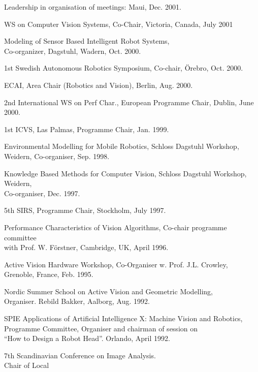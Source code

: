 \documentclass{article}
\begin{document}
\begin{cv}
\begin{cvlist}{Leadership in organisation of meetings:}
  Maui, \cftdotfill{\cftdotsep} Dec. 2001.
\item WS on Computer Vision Systems, Co-Chair, Victoria,
  Canada,\cftdotfill{\cftdotsep} July 2001
\item Modeling of Sensor Based Intelligent Robot Systems,\\
  Co-organizer, Dagstuhl, Wadern, \cftdotfill{\cftdotsep} Oct. 2000.
\item 1st Swedish Autonomous Robotics Symposium, Co-chair, \"Orebro,
  \cftdotfill{\cftdotsep}Oct. 2000.
\item ECAI, Area Chair (Robotics and Vision), Berlin,
  \cftdotfill{\cftdotsep} Aug. 2000.
\item 2nd International WS on Perf Char., European Programme Chair,
  Dublin,\cftdotfill{\cftdotsep} June 2000.
\item 1st ICVS, Las Palmas, Programme Chair, \cftdotfill{\cftdotsep}
  Jan. 1999.
\item Environmental Modelling for Mobile Robotics, Schloss Dagstuhl
  Workshop,\\ Weidern, Co-organiser, \cftdotfill{\cftdotsep}
  Sep. 1998.
\item Knowledge Based Methods for Computer Vision, Schloss Dagstuhl
  Workshop, Weidern,\\ Co-organiser, \cftdotfill{\cftdotsep}
  Dec. 1997.
\item 5th SIRS, Programme Chair, Stockholm, \cftdotfill{\cftdotsep}
  July 1997.
\item Performance Characteristics of Vision Algorithms, Co-chair
  programme committee\\ with Prof. W. F\"orstner, Cambridge, UK,
  \cftdotfill{\cftdotsep} April 1996.
\item Active Vision Hardware Workshop, Co-Organiser w. Prof. J.L.
  Crowley, \\Grenoble, France,\cftdotfill{\cftdotsep} Feb. 1995.
\item Nordic Summer School on Active Vision and Geometric Modelling,
  \\ Organiser. Rebild Bakker, Aalborg, \cftdotfill{\cftdotsep}
  Aug. 1992.
\item SPIE Applications of Artificial Intelligence X: Machine Vision
  and Robotics, \\ Programme Committee, Organiser and chairman of
  session on\\ ``How to Design a Robot Head''. Orlando,
  \cftdotfill{\cftdotsep} April 1992.
\item 7th Scandinavian Conference on Image Analysis. \\Chair of Local

\end{cvlist}
\end{cv}
\end{document}
